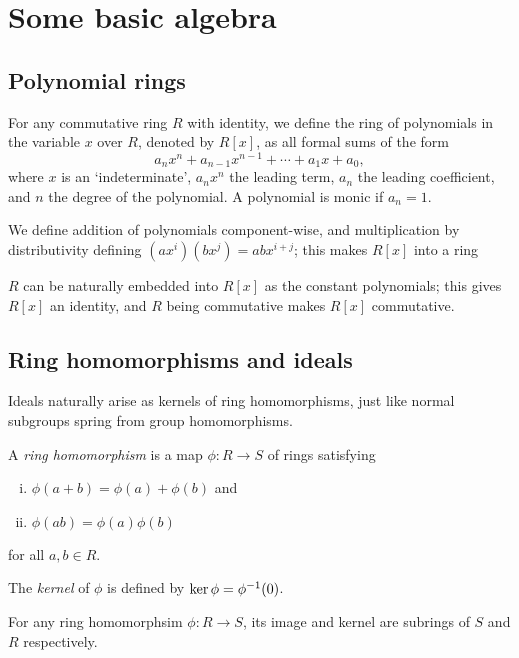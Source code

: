 \section{Some basic algebra}



\subsection{Polynomial rings}

For any commutative ring $R$ with identity, we define the ring of polynomials in the variable $x$ over $R$, denoted by $R[x]$, as all formal sums of the form
\[
	a_nx^n+a_{n-1}x^{n-1}+\cdots + a_1x + a_0,
\]
where $x$ is an `indeterminate', $a_nx^n$ the leading term, $a_n$ the leading coefficient, and $n$ the degree of the polynomial. A polynomial is monic if $a_n=1$.

We define addition of polynomials component-wise, and multiplication by distributivity defining $(ax^i)(bx^j)=abx^{i+j}$; this makes $R[x]$ into a ring

$R$ can be naturally embedded into $R[x]$ as the constant polynomials; this gives $R[x]$ an identity, and $R$ being commutative makes $R[x]$ commutative.



\subsection{Ring homomorphisms and ideals}

Ideals naturally arise as kernels of ring homomorphisms, just like normal subgroups spring from group homomorphisms.

\begin{defn}
	A \emph{ring homomorphism} is a map $\phi:R\to S$ of rings satisfying
	\begin{enumerate}[(i)]
		\item $\phi(a+b)=\phi(a)+\phi(b)$ and
		\item $\phi(ab)=\phi(a)\phi(b)$
	\end{enumerate}
	for all $a,b\in R$.

	The \emph{kernel} of $\phi$ is defined by $\ker\phi=\phi^{-1}(0)$.
\end{defn}

\begin{prop}
	For any ring homomorphsim $\phi:R\to S$, its image and kernel are subrings of $S$ and $R$ respectively.
\end{prop}

